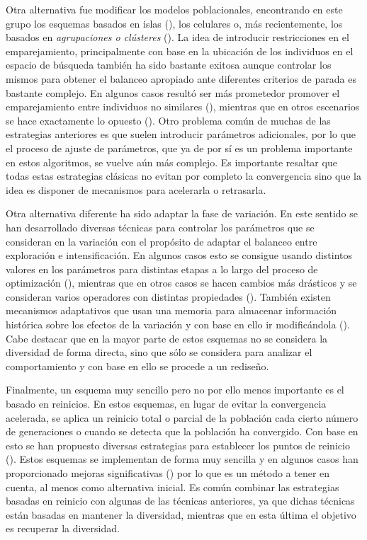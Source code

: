 Otra alternativa fue modificar los modelos poblacionales, encontrando en este grupo los esquemas basados en islas (\cite{alba2005parallel}), los celulares
o, más recientemente, los basados en \textit{agrupaciones o clústeres} (\cite{gao2014cluster}).
%
La idea de introducir restricciones en el emparejamiento, principalmente con base en la ubicación de los individuos en el espacio de búsqueda también ha sido bastante exitosa aunque controlar los mismos para obtener el balanceo apropiado ante diferentes criterios de parada es bastante complejo.
%
En algunos casos resultó ser más prometedor promover el emparejamiento entre individuos no similares (\cite{Joel:CHC}), mientras que en otros escenarios se hace exactamente lo opuesto (\cite{deb1989investigation}).
%
Otro problema común de muchas de las estrategias anteriores es que suelen introducir parámetros adicionales, por lo que el proceso de ajuste de parámetros, que ya de por sí es un problema importante en estos algoritmos, se vuelve aún más complejo.
%
Es importante resaltar que todas estas estrategias clásicas no evitan por completo la convergencia sino que la idea es disponer de mecanismos para acelerarla o retrasarla.

Otra alternativa diferente ha sido adaptar la fase de variación.
%
En este sentido se han desarrollado diversas técnicas para controlar los parámetros que se consideran en la variación con el propósito de adaptar el balanceo entre exploración e intensificación.
%
En algunos casos esto se consigue usando distintos valores en los parámetros para distintas etapas a lo largo del proceso de optimización (\cite{yu2014differential}), mientras que en otros casos se hacen cambios más drásticos y se consideran varios operadores con distintas propiedades (\cite{lobo2007parameter}).
%
También existen mecanismos adaptativos que usan una memoria para almacenar información histórica sobre los efectos de la variación y con base en ello ir modificándola (\cite{yuen2009genetic}).
%
Cabe destacar que en la mayor parte de estos esquemas no se considera la diversidad de forma directa, sino que sólo se considera para analizar el comportamiento y con base en ello se procede a un rediseño.

Finalmente, un esquema muy sencillo pero no por ello menos importante es el basado en reinicios.
%
En estos esquemas, en lugar de evitar la convergencia acelerada, se aplica un reinicio total o parcial de la población cada cierto número de generaciones o cuando se detecta que la población ha convergido.
%
Con base en esto se han propuesto diversas estrategias para establecer los puntos de reinicio (\cite{jansen2002analysis}).
%
Estos esquemas se implementan de forma muy sencilla y en algunos casos han proporcionado mejoras significativas (\cite{koumousis2006saw}) por lo que es un método a tener en cuenta, al menos como alternativa inicial.
%
Es común combinar las estrategias basadas en reinicio con algunas de las técnicas anteriores, ya que dichas técnicas están basadas en mantener la diversidad, mientras que en esta última el objetivo es recuperar la diversidad.

